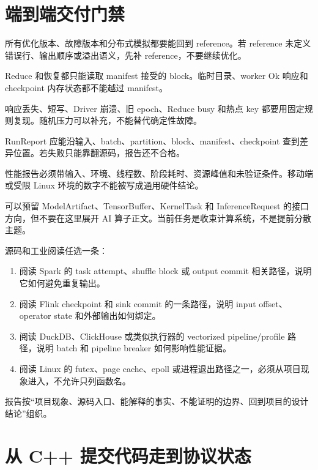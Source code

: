 \section{端到端交付门禁}

所有优化版本、故障版本和分布式模拟都要能回到 reference。若 reference 未定义错误行、输出顺序或溢出语义，先补 reference，不要继续优化。

Reduce 和恢复都只能读取 manifest 接受的 block。临时目录、worker Ok 响应和 checkpoint 内存状态都不能越过 manifest。

响应丢失、短写、Driver 崩溃、旧 epoch、Reduce busy 和热点 key 都要用固定规则复现。随机压力可以补充，不能替代确定性故障。

RunReport 应能沿输入、batch、partition、block、manifest、checkpoint 查到差异位置。若失败只能靠翻源码，报告还不合格。

性能报告必须带输入、环境、线程数、阶段耗时、资源峰值和未验证条件。移动端或受限 Linux 环境的数字不能被写成通用硬件结论。

可以预留 ModelArtifact、TensorBuffer、KernelTask 和 InferenceRequest 的接口方向，但不要在这里展开 AI 算子正文。当前任务是收束计算系统，不是提前分散主题。

\begin{sourcereadingbox}
源码和工业阅读任选一条：
\begin{enumerate}
  \item 阅读 Spark 的 task attempt、shuffle block 或 output commit 相关路径，说明它如何避免重复输出。
  \item 阅读 Flink checkpoint 和 sink commit 的一条路径，说明 input offset、operator state 和外部输出如何绑定。
  \item 阅读 DuckDB、ClickHouse 或类似执行器的 vectorized pipeline/profile 路径，说明 batch 和 pipeline breaker 如何影响性能证据。
  \item 阅读 Linux 的 futex、page cache、epoll 或进程退出路径之一，必须从项目现象进入，不允许只列函数名。
\end{enumerate}
报告按“项目现象、源码入口、能解释的事实、不能证明的边界、回到项目的设计结论”组织。
\end{sourcereadingbox}

\section{从 C++ 提交代码走到协议状态}

